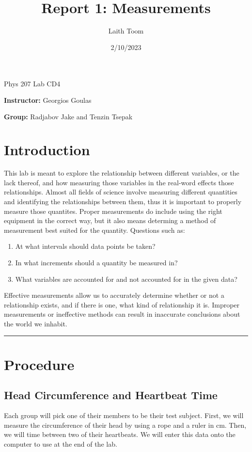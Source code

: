\documentclass{article}
\title{Report 1: Measurements}
\date{2/10/2023}
\author{Laith Toom}
\begin{document}
\maketitle
\noindent Phys 207 Lab CD4

\noindent \textbf{Instructor:} Georgios Goulas

\noindent \textbf{Group:} Radjabov Jake and Tenzin Tsepak

\newpage
\section{Introduction}
This lab is meant to explore the relationship between different variables, 
or the lack thereof, and how measuring those variables in the real-word effects 
those relationships. Almost all fields of science involve measuring different 
quantities and identifying the relationships between them, thus it is important 
to properly measure those quantites. Proper measurements do include using the 
right equipment in the correct way, but it also means determing a method of
measurement best suited for the quantity. Questions such as:
\begin{enumerate}
    \item At what intervals should data points be taken?
    \item In what increments should a quantity be measured in?
    \item What variables are accounted for and not accounted for 
    in the given data?
\end{enumerate}
Effective measurements allow us to accurately determine whether or not a relationship 
exists, and if there is one, what kind of relationship it is. Improper measurements
or ineffective methods can result in inaccurate conclusions about the world we inhabit.

\vspace{1em}
\hrule
\section{Procedure}

\subsection{Head Circumference and Heartbeat Time}
Each group will pick one of their members to be their test subject. First, we will measure the 
circumference of their head by using a rope and a ruler in cm. Then, we will time between 
two of their heartbeats. We will enter this data onto the computer to use at the end of the lab.
\end{document}
